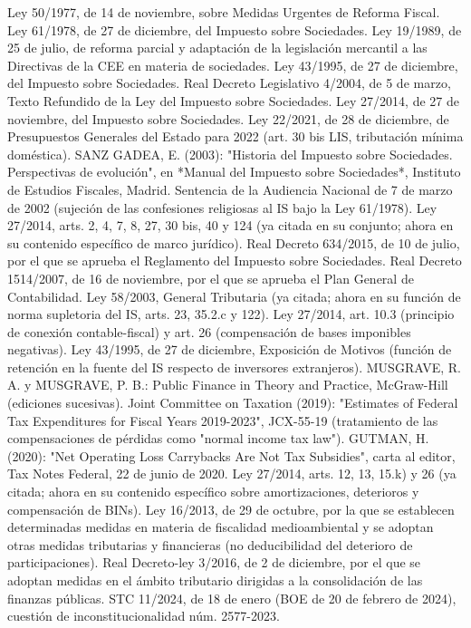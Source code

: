 \documentclass[10pt,a4paper]{article}
\begin{document}
Ley 50/1977, de 14 de noviembre, sobre Medidas Urgentes de Reforma Fiscal.
Ley 61/1978, de 27 de diciembre, del Impuesto sobre Sociedades.
Ley 19/1989, de 25 de julio, de reforma parcial y adaptación de la legislación mercantil a las Directivas de la CEE en materia de sociedades.
Ley 43/1995, de 27 de diciembre, del Impuesto sobre Sociedades.
Real Decreto Legislativo 4/2004, de 5 de marzo, Texto Refundido de la Ley del Impuesto sobre Sociedades.
Ley 27/2014, de 27 de noviembre, del Impuesto sobre Sociedades.
Ley 22/2021, de 28 de diciembre, de Presupuestos Generales del Estado para 2022 (art. 30 bis LIS, tributación mínima doméstica).
SANZ GADEA, E. (2003): "Historia del Impuesto sobre Sociedades. Perspectivas de evolución", en *Manual del Impuesto sobre Sociedades*, Instituto de Estudios Fiscales, Madrid.
Sentencia de la Audiencia Nacional de 7 de marzo de 2002 (sujeción de las confesiones religiosas al IS bajo la Ley 61/1978).
Ley 27/2014, arts. 2, 4, 7, 8, 27, 30 bis, 40 y 124 (ya citada en su conjunto; ahora en su contenido específico de marco jurídico).
Real Decreto 634/2015, de 10 de julio, por el que se aprueba el Reglamento del Impuesto sobre Sociedades.
Real Decreto 1514/2007, de 16 de noviembre, por el que se aprueba el Plan General de Contabilidad.
Ley 58/2003, General Tributaria (ya citada; ahora en su función de norma supletoria del IS, arts. 23, 35.2.c y 122).
Ley 27/2014, art. 10.3 (principio de conexión contable-fiscal) y art. 26 (compensación de bases imponibles negativas).
Ley 43/1995, de 27 de diciembre, Exposición de Motivos (función de retención en la fuente del IS respecto de inversores extranjeros).
MUSGRAVE, R. A. y MUSGRAVE, P. B.: Public Finance in Theory and Practice, McGraw-Hill (ediciones sucesivas).
Joint Committee on Taxation (2019): "Estimates of Federal Tax Expenditures for Fiscal Years 2019-2023", JCX-55-19 (tratamiento de las compensaciones de pérdidas como "normal income tax law").
GUTMAN, H. (2020): "Net Operating Loss Carrybacks Are Not Tax Subsidies", carta al editor, Tax Notes Federal, 22 de junio de 2020.
Ley 27/2014, arts. 12, 13, 15.k) y 26 (ya citada; ahora en su contenido específico sobre amortizaciones, deterioros y compensación de BINs).
Ley 16/2013, de 29 de octubre, por la que se establecen determinadas medidas en materia de fiscalidad medioambiental y se adoptan otras medidas tributarias y financieras (no deducibilidad del deterioro de participaciones).
Real Decreto-ley 3/2016, de 2 de diciembre, por el que se adoptan medidas en el ámbito tributario dirigidas a la consolidación de las finanzas públicas.
STC 11/2024, de 18 de enero (BOE de 20 de febrero de 2024), cuestión de inconstitucionalidad núm. 2577-2023.
\end{document}
